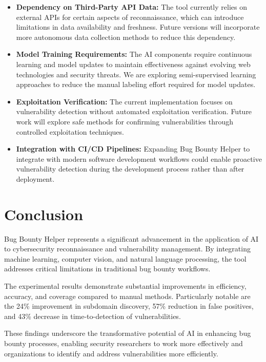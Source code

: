 \documentclass[conference]{IEEEtran}
\begin{document}
\begin{itemize}
    \item \textbf{Dependency on Third-Party API Data:} The tool currently relies on external APIs for certain aspects of reconnaissance, which can introduce limitations in data availability and freshness. Future versions will incorporate more autonomous data collection methods to reduce this dependency.
    
    \item \textbf{Model Training Requirements:} The AI components require continuous learning and model updates to maintain effectiveness against evolving web technologies and security threats. We are exploring semi-supervised learning approaches to reduce the manual labeling effort required for model updates.
    
    \item \textbf{Exploitation Verification:} The current implementation focuses on vulnerability detection without automated exploitation verification. Future work will explore safe methods for confirming vulnerabilities through controlled exploitation techniques.
    
    \item \textbf{Integration with CI/CD Pipelines:} Expanding Bug Bounty Helper to integrate with modern software development workflows could enable proactive vulnerability detection during the development process rather than after deployment.
\end{itemize}

\section{Conclusion}
Bug Bounty Helper represents a significant advancement in the application of AI to cybersecurity reconnaissance and vulnerability management. By integrating machine learning, computer vision, and natural language processing, the tool addresses critical limitations in traditional bug bounty workflows.

The experimental results demonstrate substantial improvements in efficiency, accuracy, and coverage compared to manual methods. Particularly notable are the 24\% improvement in subdomain discovery, 57\% reduction in false positives, and 43\% decrease in time-to-detection of vulnerabilities.

These findings underscore the transformative potential of AI in enhancing bug bounty processes, enabling security researchers to work more effectively and organizations to identify and address vulnerabilities more efficiently.
\end{document}
